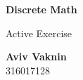 \documentclass[a4paper, 12pt]{article}
\begin{document}
    \begin{center}
        \vspace*{4.4cm}
            
        \Huge
        \textbf{Discrete Math}
            
        \vspace{0.5cm}
        \LARGE
        Active Exercise

        \vfill
            
        \Large
        \textbf{Aviv Vaknin}\\316017128
                    
    \end{center}
\end{document}
